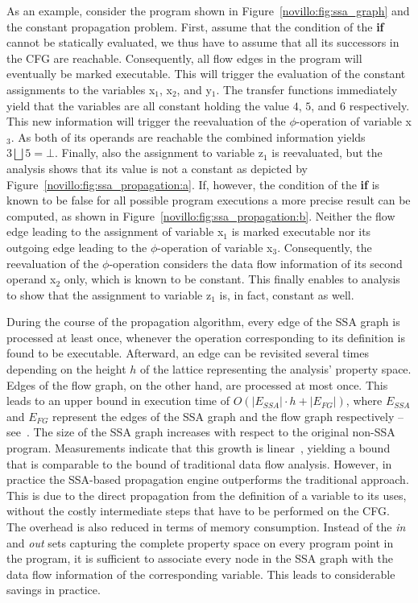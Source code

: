 As an example, consider the program shown in Figure~\ref{novillo:fig:ssa_graph}
and the constant propagation problem. First,
assume that the condition of the \textbf{if} cannot be statically evaluated, we
thus have to assume that all its successors in the CFG are reachable.
Consequently, all flow edges in the program will eventually be marked
executable. This will trigger the evaluation of the constant assignments to
the variables x$_1$,  x$_2$, and y$_1$. The transfer functions immediately yield
that the variables are all constant holding the value $4$, $5$, and $6$
respectively. This new information will trigger the reevaluation of the
$\phi$-operation of variable x$_3$. As both of its operands are reachable the
combined information yields $3 \bigsqcup 5 = \bot$. Finally, also the assignment
to variable z$_1$ is reevaluated, but the analysis shows that its value is not a
constant as depicted by Figure~\ref{novillo:fig:ssa_propagation:a}. If, however,
the condition of the \textbf{if} is known to be false for all possible program
executions a more precise result can be computed, as shown in
Figure~\ref{novillo:fig:ssa_propagation:b}. Neither the flow edge leading to the
assignment of variable x$_1$ is marked executable nor its outgoing edge leading
to the $\phi$-operation of variable x$_3$. Consequently, the reevaluation of
the $\phi$-operation considers the data flow information of its second operand
x$_2$ only, which is known to be constant. This finally enables to analysis
to show that the assignment to variable z$_1$ is, in fact, constant as well.


During the course of the propagation algorithm, every edge of the SSA graph is
processed at least once, whenever the operation corresponding to its definition
is found to be executable. Afterward, an edge can be revisited several times
depending on the height $h$ of the lattice representing the analysis' property
space. Edges of the flow graph, on the other hand, are processed at most once.
This leads to an upper bound in execution time of $O(|E_{SSA}| \cdot h +
|E_{FG}|)$, where $E_{SSA}$ and $E_{FG}$ represent the edges of the SSA graph
and the flow graph respectively -- see~\cite{bib:wegman.ea-91}. The size of the
SSA graph increases with respect to the original non-SSA program. Measurements
indicate that this growth is linear~\cite{novillo:bib:cytron.ea-91}, yielding a
bound that is comparable to the bound of traditional data flow analysis.
However, in practice the SSA-based propagation engine outperforms the
traditional approach. This is  due to the direct propagation from the definition
of a variable to its uses, without the costly intermediate steps that have to be
performed on the CFG. The overhead is also reduced in terms of memory
consumption. Instead of the \emph{in} and \emph{out} sets capturing the complete
property space on every program point in the program, it is sufficient to
associate every node in the SSA graph with the data flow information of the
corresponding variable. This leads to considerable savings in practice.

